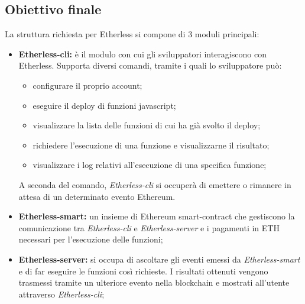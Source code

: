 \subsection{Obiettivo finale}
La struttura richiesta per Etherless si compone di 3 moduli principali: 
\begin{itemize}
	\item \textbf{Etherless-cli:} è il modulo con cui gli sviluppatori interagiscono con Etherless. Supporta diversi comandi, tramite i quali lo sviluppatore può: 
		\begin{itemize}
			\item configurare il proprio account; 
			\item eseguire il deploy di funzioni javascript; 
			\item visualizzare la lista delle funzioni di cui ha già svolto il deploy; 
			\item richiedere l'esecuzione di una funzione e visualizzarne il risultato; 
			\item visualizzare i log relativi all'esecuzione di una specifica funzione; 
		\end{itemize}  
	A seconda del comando, \textit{Etherless-cli} si occuperà di emettere o rimanere in attesa di un determinato evento Ethereum. 
	
	\item \textbf{Etherless-smart:} un insieme di Ethereum smart-contract che gestiscono la comunicazione tra \textit{Etherless-cli} e \textit{Etherless-server} e i pagamenti in ETH necessari per l'esecuzione delle funzioni; 
	\item \textbf{Etherless-server:} si occupa di ascoltare gli eventi emessi da \textit{Etherless-smart} e di far eseguire le funzioni così richieste. I risultati ottenuti vengono trasmessi tramite un ulteriore evento nella blockchain e mostrati all'utente attraverso \textit{Etherless-cli};  
\end{itemize}

